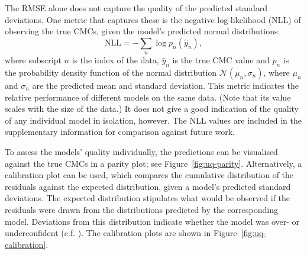 The RMSE alone does not capture the quality of the predicted standard
deviations. One metric that captures these is the negative log-likelihood (NLL)
of observing the true CMCs, given the model's predicted normal distributions:
\begin{equation}
    \text{NLL} = -\sum_n \log p_n(\hat{y}_n),
\end{equation}
where subscript $n$ is the index of the data, $\hat{y}_n$ is the true CMC value and $p_n$ is the probability density function of the normal distribution $\mathcal{N}(\mu_n, \sigma_n)$, where $\mu_n$ and $\sigma_n$ are the predicted
mean and standard deviation. This metric indicates the relative performance of different models on the same data. (Note that its value scales with the size of the data.) It does not give a good indication of the quality of any individual
model in isolation, however. The NLL values are included in the supplementary information for comparison against future work.

To assess the models' quality individually, the predictions can be visualised
against the true CMCs in a parity plot; see Figure~\ref{fig:uq-parity}.
Alternatively, a calibration plot can be used, which compares the cumulative
distribution of the residuals against the expected distribution, given a model's
predicted standard deviations. The expected distribution stipulates what would
be observed if the residuals were drawn from the distributions predicted by the
corresponding model. Deviations from this distribution indicate whether the
model was over- or underconfident (c.f.
\citet{tranMethodsComparingUncertainty2020}). The calibration plots are shown in
Figure~\ref{fig:uq-calibration}.

